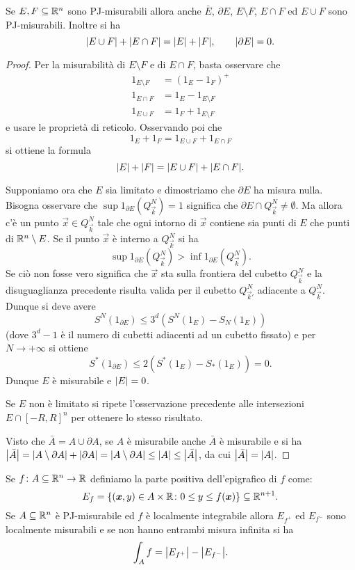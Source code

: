 \begin{theorem}
Se $E,F\subseteq {\mathbb R}^n$ sono PJ-misurabili allora anche $\bar E$, $\partial E$, 
$E\setminus F$, $E\cap F$ ed $E\cup F$ sono PJ-misurabili.
Inoltre si ha 
\[
    {\left|E\cup F\right|} + {\left|E\cap F\right|} = {\left|E\right|} + {\left|F\right|},
    \qquad
    {\left|\partial E\right|} = 0.
\]
\end{theorem}
\begin{proof}
Per la misurabilità di $E\setminus F$ e di $E\cap F$, basta osservare che 
\begin{align*}
  1_{E\setminus F} &= (1_E - 1_F)^+\\
  1_{E\cap F} &= 1_E - 1_{E\setminus F}\\
  1_{E\cup F} &= 1_F + 1_{E\setminus F}
\end{align*}
e usare le proprietà di reticolo.
Osservando poi che 
\[
 1_E + 1_F = 1_{E\cup F} + 1_{E\cap F}
\]
si ottiene la formula
\[
{\left|E\right|} + {\left|F\right|} = {\left|E\cup F\right|} + {\left|E\cap F\right|}.
\]

Supponiamo ora che $E$ sia limitato
e dimostriamo che $\partial E$ ha misura nulla.
Bisogna osservare 
che $\sup 1_{\partial E}(Q^N_{\vec k}) = 1$ 
significa che $\partial E\cap Q^N_{\vec k} \neq \emptyset$.
Ma allora c'è un punto $\vec x\in Q^N_{\vec k}$ tale che ogni intorno 
di $\vec x$ contiene sia punti di $E$ che punti di ${\mathbb R}^n\setminus E$.
Se il punto $\vec x$ è interno a $Q^N_{\vec k}$ si ha
\[
  \sup 1_{\partial E}(Q^N_{\vec k}) > \inf 1_{\partial E}(Q^N_{\vec k}).
\]
Se ciò non fosse vero significa che $\vec x$ sta sulla frontiera del cubetto 
$Q^N_{\vec k}$ e la disuguaglianza precedente risulta valida 
per il cubetto $Q^N_{\vec k'}$ adiacente a $Q^N_{\vec k}$.
Dunque si deve avere 
\[
  S^N(1_{\partial E})\le 3^d (S^N(1_E)-S_N(1_E))
\]
(dove $3^d-1$ è il numero di cubetti adiacenti ad un cubetto fissato)
e per $N\to +\infty$ si ottiene 
\[
  S^*(1_{\partial E}) \le 2(S^*(1_E)-S_*(1_E)) = 0.
\]
Dunque $E$ è misurabile e ${\left|E\right|} = 0$.

Se $E$ non è limitato si ripete l'osservazione precedente alle intersezioni 
$E\cap [-R,R]^n$ per ottenere lo stesso risultato.

Visto che $\bar A = A \cup \partial A$, se $A$ è misurabile anche $\bar A$ è 
misurabile e si ha ${\left|\bar A\right|} = {\left|A\setminus \partial A\right|} + {\left|\partial A\right|}
= {\left|A \setminus \partial A\right|} \le {\left|A\right|} \le {\left|\bar A\right|}$,
da cui ${\left|\bar A\right|}={\left|A\right|}$.
\end{proof}

\begin{theorem}
Se $f\colon A\subseteq {\mathbb R}^n \to {\mathbb R}$ definiamo la parte positiva dell'epigrafico di $f$
come:
\[
  E_f = {\left\{ (\boldsymbol x,y)\in A\times {\mathbb R} \colon 0 \le y \le f(\boldsymbol x) \right\}} \subseteq {\mathbb R}^{n+1}.
\]
Se $A\subseteq {\mathbb R}^n$ è PJ-misurabile ed $f$ è localmente integrabile 
allora $E_{f^+}$ ed $E_{f^-}$ sono localmente misurabili e se non
hanno entrambi misura infinita si ha 
\[
  \int_A f = {\left|E_{f^+}\right|} - {\left|E_{f^-}\right|}.
\]
\end{theorem}

